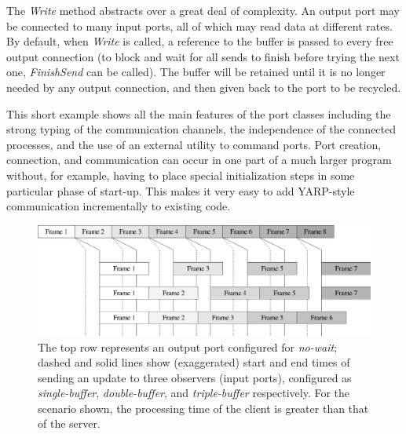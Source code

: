 The {\em Write} method abstracts over a great deal of complexity.
An output port may be connected to many input ports, all of which
may read data at different rates.  By default, when {\em Write}
is called, a reference to the buffer is passed to
every free output connection (to block and wait for all sends to finish before trying the next one, {\em FinishSend} can be called).  The buffer will be retained
until it is no longer needed by any output connection, and then
given back to the port to be recycled.  

This short example shows all the main features of the port classes including the strong
typing of the communication channels, the independence of the connected processes, and
the use of an external utility to command ports.
%
Port creation, connection, and communication can occur in one part of a much larger
program without, for example, having to place special initialization steps in some
particular phase of start-up.  This makes it very easy to add YARP-style communication
incrementally to existing code.


\begin{figure}[t]
\includegraphics[width=\columnwidth]{fig-throughput-nowait}
\caption{
The top row represents an output port configured for \textit{no-wait};
dashed and solid lines show (exaggerated) start and end times of 
sending an update to three observers (input ports), configured as
 \textit{single-buffer},
 \textit{double-buffer},
and \textit{triple-buffer}
respectively.  For the scenario shown, the processing time of the
client is greater than that of the server.
}
\label{fig:throughput-nowait}
\end{figure}


